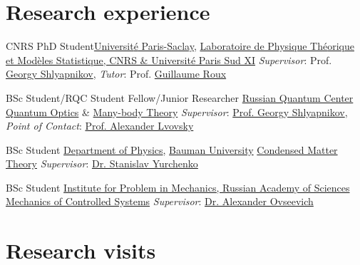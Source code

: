 \documentclass[10pt,a4paper,sans]{moderncv}
\begin{document}
\section{Research experience}

	{CNRS PhD Student}{{\textcolor{blue}{\href{https://www.universite-paris-saclay.fr/en/}{Universit{\' e} Paris-Saclay}}},
	\textcolor{blue}{\href{http://lptms.u-psud.fr/en}{Laboratoire de Physique Th{\'e}orique et Mod{\`e}les Statistique, CNRS \& Universit{\' e} Paris Sud XI}}}
	{\textit{Supervisor}: Prof. \textcolor{blue}{\href{http://staff.science.uva.nl/~walraven/shlyapnikov/GoraShlyapnikov-french.htm}{Georgy Shlyapnikov}},
	{\textit{Tutor}: Prof. \textcolor{blue}{\href{http://lptms.u-psud.fr/membres/groux/}{Guillaume Roux}}}}{}{}{}{}


	{BSc Student/RQC Student Fellow/Junior Researcher}
	{\textcolor{blue}{\href{http://rqc.ru}{Russian Quantum Center}}}
	{\textcolor{blue}{\href{http://www.rqc.ru/groups/lvovsky/}{Quantum Optics}} \& 
	\textcolor{blue}{\href{http://www.rqc.ru/groups/shlyapnikov/}{Many-body Theory}}}
	{\textit{Supervisor}: \textcolor{blue}{\href{http://www.rqc.ru/members/georgy.shlyapnikov/}{Prof. Georgy Shlyapnikov}},
	{\textit{Point of Contact}: \textcolor{blue}{\href{http://www.rqc.ru/members/alexander.lvovsky/}{Prof. Alexander Lvovsky}}}}{}                                            
	
	{BSc Student}
	{\textcolor{blue}{\href{http://fn.bmstu.ru/index.php/fn4}{Department of Physics}}, \textcolor{blue}{\textcolor{blue}{\href{http://bmstu.ru}{Bauman University}}}}
	{\newline \textcolor{blue}{\href{http://teratech.ru/en}{Condensed Matter Theory}}}
	{\textit{Supervisor}: \textcolor{blue}{\href{http://teratech.ru/en/peoples}{Dr. Stanislav Yurchenko}}}{}

	{BSc Student}
	{\textcolor{blue}{\href{http://www.ipmnet.ru}{Institute for Problem in Mechanics, Russian Academy of Sciences}}}
	{\newline \textcolor{blue}{\href{http://www.ipmnet.ru/lab02.htm}{Mechanics of Controlled Systems}}}
	{\textit{Supervisor}: \textcolor{blue}{\href{http://www.ipmnet.ru/lab02/Ovseevich.htm}{Dr. Alexander Ovseevich}}}{}
	
\section{Research visits}
\end{document}
